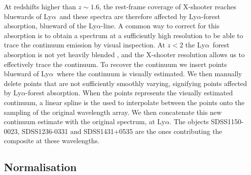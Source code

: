 \documentclass{aa}    %
\newcommand{\sectlabel}[1]{\label{sect:#1}}
\newcommand{\lya}{Ly$\alpha$}
\begin{document}
At redshifts higher than $z\sim1.6$, the rest-frame coverage of X-shooter
reaches bluewards of \lya~and these spectra are therefore affected by
\lya-forest absorption, blueward of the \lya-line. A common way to correct for
this absorption is to obtain a spectrum at a sufficiently high resolution to be
able to trace the continuum emission by visual inspection. At $z < 2 $ the
\lya~forest absorption is not yet heavily blended \citep{DallAglio2008}, and the
X-shooter resolution allows us to effectively trace the continuum. To recover
the continuum we insert points blueward of \lya~where the continuum is visually estimated.
We then manually delete points that are not sufficiently smoothly
varying, signifying points affected by \lya-forest absorption. 
When the points
represents the visually estimated continuum, a linear spline is the used to
interpolate between the points onto the sampling of the original wavelength
array. We then concatenate this new continuum estimate with the original
spectrum, at \lya. The objects SDSS1150-0023, SDSS1236-0331 and SDSS1431+0535
are the ones contributing the composite at these wavelengths. 


\subsection{Normalisation}  \sectlabel{norm}
\end{document}
